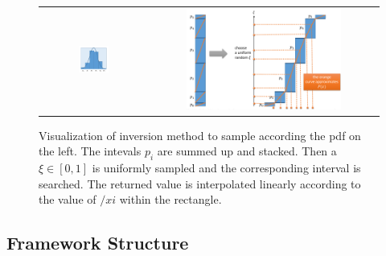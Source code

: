 \documentclass[a4paper,10pt]{article}
\begin{document}
    \begin{center}
        \begin{figure}
            \centering    
            \begin{tabular}{c c}
            \includegraphics[width=0.3\textwidth]{images/impsampling_rectangles.png} &
            \includegraphics[width=0.7\textwidth]{images/inversion.png}
            \end{tabular}
            \caption[Inversion method for importance sampling]{
                Visualization of inversion method to sample according the
                pdf on the left.
                The intevals $p_i$ are summed up and stacked.
                Then a $\xi \in [0,1]$ is uniformly sampled and the corresponding
                interval is searched.
                The returned value is interpolated linearly according to the value
                of $/xi$ within the rectangle.
            }
            \label{fig:impsampling}
        \end{figure}
    \end{center}
    
    \subsection{Framework Structure}
\end{document}
